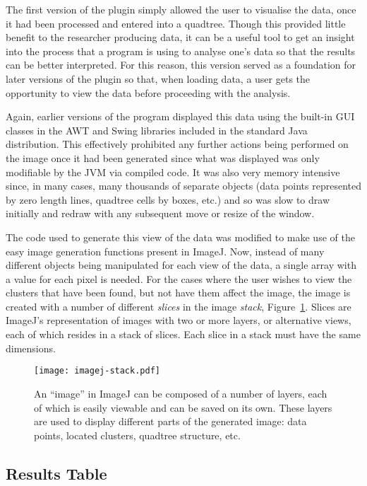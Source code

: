 The first version of the plugin simply allowed the user to visualise the data,
once it had been processed and entered into a quadtree. Though this provided
little benefit to the researcher producing data, it can be a useful tool to get
an insight into the process that a program is using to analyse one's data so
that the results can be better interpreted. For this reason, this version
served as a foundation for later versions of the plugin so that, when loading
data, a user gets the opportunity to view the data before proceeding with the
analysis.

Again, earlier versions of the program displayed this data using the built-in
GUI classes in the AWT\cite{zukowski1997java} and Swing\cite{loy2002java}
libraries included in the standard Java distribution. This effectively
prohibited any further actions being performed on the image once it had been
generated since what was displayed was only modifiable by the JVM via compiled
code. It was also very memory intensive since, in many cases, many thousands of
separate objects (data points represented by zero length lines, quadtree cells
by boxes, etc.) and so was slow to draw initially and redraw with any
subsequent move or resize of the window.

The code used to generate this view of the data was modified to make use of the
easy image generation functions present in ImageJ. Now, instead of many
different objects being manipulated for each view of the data, a single array
with a value for each pixel is needed. For the cases where the user wishes to
view the clusters that have been found, but not have them affect the image, the
image is created with a number of different \emph{slices} in the image
\emph{stack}, Figure~\ref{fig:imagej-stack}. Slices are ImageJ's representation
of images with two or more layers, or alternative views, each of which resides
in a stack of slices. Each slice in a stack must have the same dimensions.

\begin{figure}[tbhp]
	\centering
	\texttt{[image: imagej-stack.pdf]}
	\caption{An ``image'' in ImageJ can be composed of a number of layers, each
		of which is easily viewable and can be saved on its own. These layers
		are used to display different parts of the generated image: data
		points, located clusters, quadtree structure, etc.}\label{fig:imagej-stack}
\end{figure}

\subsection{Results Table}
\label{sub:results_table}

